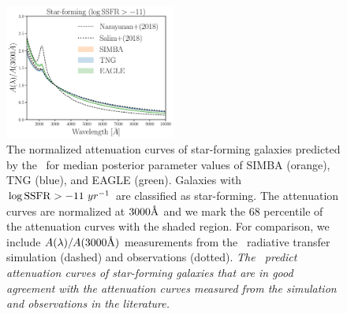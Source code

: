 
\begin{figure}
\begin{center}
    \includegraphics[width=0.5\textwidth]{figs/abc_sf_attenuation.pdf}
    \caption{\label{fig:sfatten}
    The normalized attenuation curves of star-forming galaxies predicted by
    the \eda~for median posterior parameter values of SIMBA (orange), TNG
    (blue), and EAGLE (green).  
    Galaxies with $\log {\rm SSFR} > -11~yr^{-1}$ are classified as star-forming. 
    The attenuation curves are normalized at $3000\AA$ and we mark the
    68 percentile of the attenuation curves with the shaded region.
    For comparison, we include $A(\lambda)/A(3000\AA)$ measurements from
    the~\cite{narayanan2018} radiative transfer simulation (dashed) and
    \cite{salim2018} observations (dotted).
    {\em The \eda~predict attenuation curves of star-forming galaxies that
    are in good agreement with the attenuation curves measured from
    the simulation and observations in the literature.}
    }
\end{center}
\end{figure}

